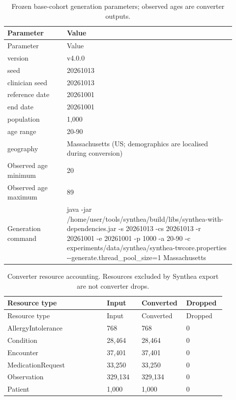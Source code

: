 {\small\setlength{\tabcolsep}{3pt}
\begin{longtable}{p{0.24\linewidth}p{0.68\linewidth}}
\caption{Frozen base-cohort generation parameters; observed ages are converter outputs.}\label{sup:generation}\\
\hline
Parameter & Value \\ \hline
\endfirsthead
\hline
Parameter & Value \\ \hline
\endhead
version & v4.\allowbreak{}0.\allowbreak{}0 \\
seed & 20261013 \\
clinician seed & 20261013 \\
reference date & 20261001 \\
end date & 20261001 \\
population & 1,000 \\
age range & 20-\allowbreak{}90 \\
geography & Massachusetts (US; demographics are localised during conversion) \\
Observed age minimum & 20 \\
Observed age maximum & 89 \\
Generation command & java -\allowbreak{}jar /\allowbreak{}home/\allowbreak{}user/\allowbreak{}tools/\allowbreak{}synthea/\allowbreak{}build/\allowbreak{}libs/\allowbreak{}synthea-\allowbreak{}with-\allowbreak{}dependencies.\allowbreak{}jar -\allowbreak{}s 20261013 -\allowbreak{}cs 20261013 -\allowbreak{}r 20261001 -\allowbreak{}e 20261001 -\allowbreak{}p 1000 -\allowbreak{}a 20-\allowbreak{}90 -\allowbreak{}c experiments/\allowbreak{}data/\allowbreak{}synthea/\allowbreak{}synthea-\allowbreak{}twcore.\allowbreak{}properties -\allowbreak{}-\allowbreak{}generate.\allowbreak{}thread\_\allowbreak{}pool\_\allowbreak{}size=1 Massachusetts \\
\hline\end{longtable}}

{\small\setlength{\tabcolsep}{3pt}
\begin{longtable}{p{0.43\linewidth}p{0.15\linewidth}p{0.15\linewidth}p{0.15\linewidth}}
\caption{Converter resource accounting. Resources excluded by Synthea export are not converter drops.}\label{sup:conversionresources}\\
\hline
Resource type & Input & Converted & Dropped \\ \hline
\endfirsthead
\hline
Resource type & Input & Converted & Dropped \\ \hline
\endhead
AllergyIntolerance & 768 & 768 & 0 \\
Condition & 28,464 & 28,464 & 0 \\
Encounter & 37,401 & 37,401 & 0 \\
MedicationRequest & 33,250 & 33,250 & 0 \\
Observation & 329,134 & 329,134 & 0 \\
Patient & 1,000 & 1,000 & 0 \\
\hline\end{longtable}}

